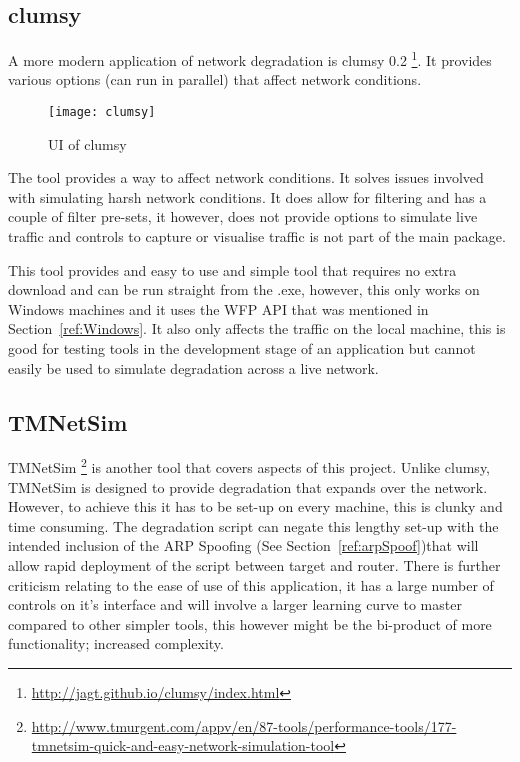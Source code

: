 \subsection{clumsy}
A more modern application of network degradation is clumsy 0.2 \footnote{\url{http://jagt.github.io/clumsy/index.html}}. It provides various options (can run in parallel) that affect network conditions. 

\begin{wrapfigure}{r}{5cm}
\begin{center}
	\texttt{[image: clumsy]}
	\caption{UI of clumsy}
\end{center}
\end{wrapfigure}

The tool provides a way to affect network conditions. It solves issues involved with simulating harsh network conditions. It does allow for filtering and has a couple of filter pre-sets, it however, does not provide options to simulate live traffic and controls to capture or visualise traffic is not part of the main package.

This tool provides and easy to use and simple tool that requires no extra download and can be run straight from the .exe, however, this only works on Windows machines and it uses the WFP API that was mentioned in Section~\ref{ref:Windows}. It also only affects the traffic on the local machine, this is good for testing tools in the development stage of an application but cannot easily be used to simulate degradation across a live network.

\subsection{TMNetSim}
TMNetSim \footnote{\url{http://www.tmurgent.com/appv/en/87-tools/performance-tools/177-tmnetsim-quick-and-easy-network-simulation-tool}} is another tool that covers aspects of this project. Unlike clumsy, TMNetSim is designed to provide degradation that expands over the network. However, to achieve this it has to be set-up on every machine, this is clunky and time consuming. The degradation script can negate this lengthy set-up with the intended inclusion of the ARP Spoofing (See Section~\ref{ref:arpSpoof})that will allow rapid deployment of the script between target and router. There is further criticism relating to the ease of use of this application, it has a large number of controls on it's interface and will involve a larger learning curve to master compared to other simpler tools, this however might be the bi-product of more functionality; increased complexity.


